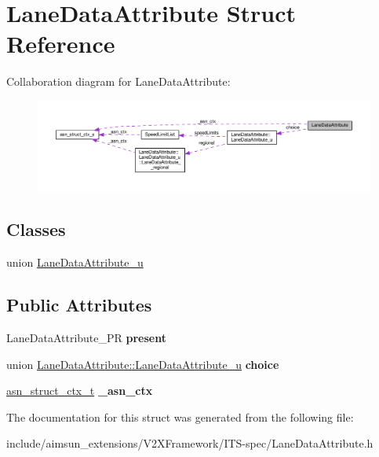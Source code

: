 \hypertarget{structLaneDataAttribute}{}\section{Lane\+Data\+Attribute Struct Reference}
\label{structLaneDataAttribute}


Collaboration diagram for Lane\+Data\+Attribute\+:\nopagebreak
\begin{figure}[H]
\begin{center}
\leavevmode
\includegraphics[width=350pt]{structLaneDataAttribute__coll__graph}
\end{center}
\end{figure}
\subsection*{Classes}
\begin{DoxyCompactItemize}
\item 
union \hyperlink{unionLaneDataAttribute_1_1LaneDataAttribute__u}{Lane\+Data\+Attribute\+\_\+u}
\end{DoxyCompactItemize}
\subsection*{Public Attributes}
\begin{DoxyCompactItemize}
\item 
Lane\+Data\+Attribute\+\_\+\+PR {\bfseries present}\hypertarget{structLaneDataAttribute_a2ae1cd5bfae3c61fb71b9fbee911c8ff}{}\label{structLaneDataAttribute_a2ae1cd5bfae3c61fb71b9fbee911c8ff}

\item 
union \hyperlink{unionLaneDataAttribute_1_1LaneDataAttribute__u}{Lane\+Data\+Attribute\+::\+Lane\+Data\+Attribute\+\_\+u} {\bfseries choice}\hypertarget{structLaneDataAttribute_a58e13662c0f5849af37b6175bbbb7b71}{}\label{structLaneDataAttribute_a58e13662c0f5849af37b6175bbbb7b71}

\item 
\hyperlink{structasn__struct__ctx__s}{asn\+\_\+struct\+\_\+ctx\+\_\+t} {\bfseries \+\_\+asn\+\_\+ctx}\hypertarget{structLaneDataAttribute_af2420dded7ae843429e605564084c9ce}{}\label{structLaneDataAttribute_af2420dded7ae843429e605564084c9ce}

\end{DoxyCompactItemize}


The documentation for this struct was generated from the following file\+:\begin{DoxyCompactItemize}
\item 
include/aimsun\+\_\+extensions/\+V2\+X\+Framework/\+I\+T\+S-\/spec/Lane\+Data\+Attribute.\+h\end{DoxyCompactItemize}
